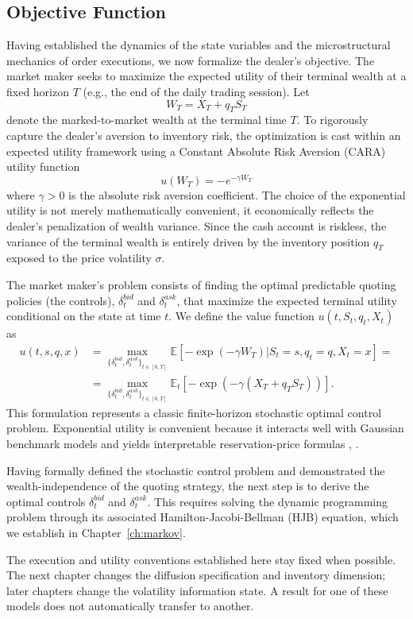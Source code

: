 \subsection{Objective Function}
Having established the dynamics of the state variables and the microstructural mechanics of order executions, we now formalize the dealer's objective. The market maker seeks to maximize the expected utility of their terminal wealth at a fixed horizon $T$ (e.g., the end of the daily trading session). Let 
\[
W_T = X_T + q_TS_T
\]
denote the marked-to-market wealth at the terminal time $T$. To rigorously capture the dealer's aversion to inventory risk, the optimization is cast within an expected utility framework using a Constant Absolute Risk Aversion (CARA) utility function
\[
u(W_T) = -e^{-\gamma W_T} 
\]
where $\gamma>0$ is the absolute risk aversion coefficient. The choice of the exponential utility is not merely mathematically convenient, it economically reflects the dealer's penalization of wealth variance. Since the cash account is riskless, the variance of the terminal wealth is entirely driven by the inventory position $q_T$ exposed to the price volatility $\sigma$.

The market maker's problem consists of finding the optimal predictable quoting policies (the controls), $\delta_t^{bid}$ and $\delta_t^{ask}$, that maximize the expected terminal utility conditional on the state at time $t$. We define the value function $u(t,S_t ,q_t, X_t)$ as
\begin{align*}
    u(t,s,q,x)&=\max_{\{\delta_t^{bid},\delta_t^{ask}\}_{t\in[0,T]}} \mathbb{E}\left[-\exp\!\left(-\gamma W_T\right)|S_t=s,q_t=q,X_t=x\right]=\\
    &=\max_{\{\delta_t^{bid},\delta_t^{ask}\}_{t\in[0,T]}} \mathbb{E}_t\left[-\exp\!\left(-\gamma (X_T+q_TS_T)\right)\right].
\end{align*}
This formulation represents a classic finite-horizon stochastic optimal control problem. Exponential utility is convenient because it interacts well with Gaussian benchmark models and yields interpretable reservation-price formulas \cite{AvellanedaStoikov2008}, \cite{GueantLehalleFernandezTapia2013}.

Having formally defined the stochastic control problem and demonstrated the wealth-independence of the quoting strategy, the next step is to derive the optimal controls $\delta_t^{bid}$ and $\delta_t^{ask}$. This requires solving the dynamic programming problem through its associated Hamilton-Jacobi-Bellman (HJB) equation, which we establish in Chapter~\ref{ch:markov}.

The execution and utility conventions established here stay fixed when possible. The next chapter changes the diffusion specification and inventory dimension; later chapters change the volatility information state. A result for one of these models does not automatically transfer to another.
